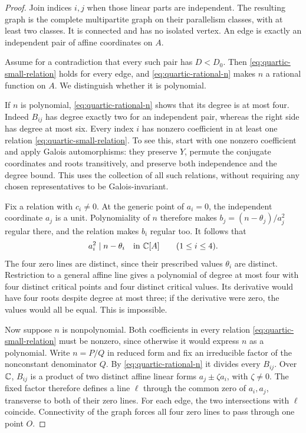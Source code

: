 \begin{proof}
Join indices $i,j$ when those linear parts are independent.  The resulting
graph is the complete multipartite graph on their parallelism classes,
with at least two classes.  It is connected and has no isolated vertex.
An edge is exactly an independent pair of affine coordinates on $A$.

Assume for a contradiction that every such pair has $D<D_0$.  Then
\eqref{eq:quartic-small-relation} holds for every edge, and
\eqref{eq:quartic-rational-n} makes $n$ a rational function on $A$.
We distinguish whether it is polynomial.

If $n$ is polynomial, \eqref{eq:quartic-rational-n} shows that its degree
is at most four.  Indeed $B_{ij}$ has degree exactly two for an
independent pair, whereas the right side has degree at most six.
Every index $i$ has nonzero coefficient in at least one relation
\eqref{eq:quartic-small-relation}.  To see this, start with one nonzero
coefficient and apply Galois automorphisms: they preserve $Y$, permute
the conjugate coordinates and roots transitively, and preserve both
independence and the degree bound.  This uses the collection of all
such relations, without requiring any chosen representatives to be
Galois-invariant.

Fix a relation with $c_i\ne0$.  At the generic point of $a_i=0$,
the independent coordinate $a_j$ is a unit.  Polynomiality of $n$
therefore makes $b_j=(n-\theta_j)/a_j^2$ regular there, and the relation
makes $b_i$ regular too.  It follows that
\[
 a_i^2\mid n-\theta_i\quad\hbox{in }\mathbb C[A]
 \qquad(1\le i\le4).
\]
The four zero lines are distinct, since their prescribed values
$\theta_i$ are distinct.  Restriction to a general affine line gives
a polynomial of degree at most four with four distinct critical points
and four distinct critical values.  Its derivative would have four
roots despite degree at most three; if the derivative were zero, the
values would all be equal.  This is impossible.

Now suppose $n$ is nonpolynomial.  Both coefficients in every relation
\eqref{eq:quartic-small-relation} must be nonzero, since otherwise it
would express $n$ as a polynomial.  Write $n=P/Q$ in reduced form and
fix an irreducible factor of the nonconstant denominator $Q$.  By
\eqref{eq:quartic-rational-n} it divides every $B_{ij}$.  Over $\mathbb C$,
$B_{ij}$ is a product of two distinct affine linear forms
$a_j\pm\zeta a_i$, with $\zeta\ne0$.  The fixed factor therefore defines
a line $\ell$ through the common zero of $a_i,a_j$, transverse to both
of their zero lines.  For each edge, the two intersections with $\ell$
coincide.  Connectivity of the graph forces all four zero lines to
pass through one point $O$.


\end{proof}
